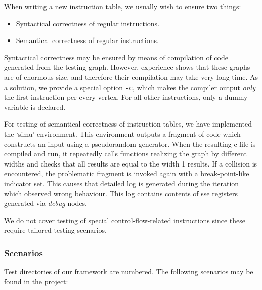 When writing a new instruction table, we usually wish to ensure two things:
\begin{itemize}
  \item Syntactical correctness of regular instructions.
  \item Semantical correctness of regular instructions.
\end{itemize}

Syntactical correctness may be ensured by means of compilation of code generated from the testing graph. However, experience shows that these graphs are of enormous size, and therefore their compilation may take very long time. As a solution, we provide a special option \texttt{-c}, which makes the compiler output \emph{only} the first instruction per every vertex. For all other instructions, only a dummy variable is declared.

For testing of semantical correctness of instruction tables, we have implemented the `simu' environment. This environment outputs a fragment of code which constructs an input using a pseudorandom generator. When the resulting c file is compiled and run, it repeatedly calls functions realizing the graph by different widths and checks that all results are equal to the width 1 results. If a collision is encountered, the problematic fragment is invoked again with a break-point-like indicator set. This causes that detailed log is generated during the iteration which observed wrong behaviour. This log contains contents of sse registers generated via \emph{debug} nodes.

We do not cover testing of special control-flow-related instructions since these require tailored testing scenarios.


\subsubsection{Scenarios}

Test directories of our framework are numbered. The following scenarios may be found in the project:

